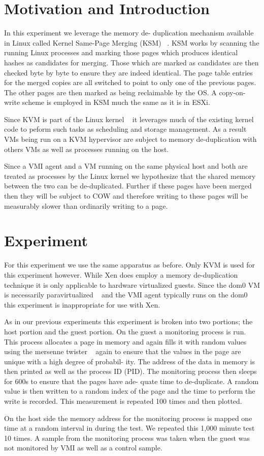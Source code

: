 
\section{Motivation and Introduction}

In this experiment we leverage the memory de- duplication mechanism available in Linux called Kernel Same-Page Merging (KSM) ~\cite{arcangeli_increasing_2009}. KSM works by scanning the running Linux processes and marking those pages which produces identical hashes as candidates for merging. Those which are marked as candidates are then checked byte by byte to ensure they are indeed identical. The page table entries for the merged copies are all switched to point to only one of the previous pages. The other pages are then marked as being reclaimable by the OS. A copy-on-write scheme is employed in KSM much the same as it is in ESXi. 


Since KVM is part of the Linux kernel ~\cite{_Linux_archive} it leverages much of the existing kernel code to peform such tasks as scheduling and storage management. As a result VMs being run on a KVM hypervisor are subject to memory de-duplication with others VMs as well as processes running on the host. 


Since a VMI agent and a VM running on the same physical host and both are treated as processes by the Linux kernel we hypothesize that the shared memory between the two can be de-duplicated. Further if these pages have been merged then they will be subject to COW and therefore writing to these pages will be measurably slower than ordinarily writing to a page. 

\section{Experiment}

For this experiment we use the same apparatus as before. Only KVM is used for this experiment however. While Xen does employ a memory de-duplication technique it is only applicable to hardware virtualized guests. Since the dom0 VM is necessarily paravirtualized ~\cite{barham_xen_2003} and the VMI agent typically runs on the dom0 this experiment is inappropriate for use with Xen. 

As in our previous experiments this experiment is broken into two portions; the host portion and the guest portion. On the guest a monitoring process is run. This process allocates a page in memory and again fills it with random values using the mersenne twister ~\cite{matsumoto_mersenne_1998} again to ensure that the values in the page are unique with a high degree of probabil- ity. The address of the data in memory is then printed as well as the process ID (PID). The monitoring process then sleeps for 600s to ensure that the pages have ade- quate time to de-duplicate. A random value is then written to a random index of the page and the time to perform the write is recorded. This measurement is repeated 100 times and then plotted. 

On the host side the memory address for the monitoring process is mapped one time at a random interval in during the test. We repeated this 1,000 minute test 10 times. A sample from the monitoring process was taken when the guest was not monitored by VMI as well as a control sample.
